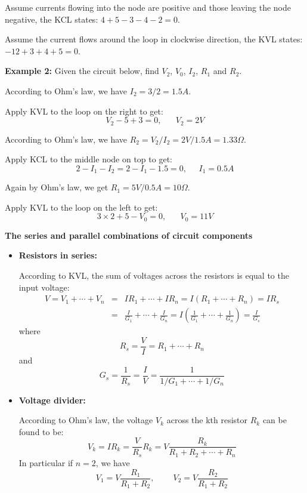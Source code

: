 \begin{itemize}

Assume currents flowing into the node are positive and those leaving the 
node negative, the KCL states: $4+5-3-4-2=0$. 

Assume the current flows around the loop in clockwise direction, the KVL
states: $-12+3+4+5=0$. 

{\bf Example 2:}  Given the circuit below, find $V_2$, $V_0$, $I_2$, $R_1$
and $R_2$.


According to Ohm's law, we have $I_2=3/2=1.5A$.  

Apply KVL to the loop on the right to get:
\[  V_2-5+3=0,\;\;\;\;\;\; V_2=2V \]

According to Ohm's law, we have $R_2=V_2/I_2=2V/1.5A=1.33\Omega$.

Apply KCL to the middle node on top to get:
\[ 2-I_1-I_2=2-I_1-1.5=0,\;\;\;\;\;I_1=0.5A \]

Again by Ohm's law, we get $R_1=5V/0.5A=10\Omega$. 

Apply KVL to the loop on the left to get:
\[ 3\times 2 +5-V_0=0,\;\;\;\;\;\;V_0=11V \]

{\bf The series and parallel combinations of circuit components}

\begin{itemize}

\item {\bf Resistors in series:} 


  According to KVL, the sum of voltages across 
  the resistors is equal to the input voltage:
  \begin{eqnarray}	
    V=V_1+\cdots+V_n&=&IR_1+\cdots+IR_n=I(R_1+\cdots+R_n)=IR_s
    \nonumber \\
    &=&\frac{I}{G_1}+\cdots+\frac{I}{G_n}
    =I\left(\frac{1}{G_1}+\cdots+\frac{1}{G_n}\right)=\frac{I}{G_s}
    \nonumber
  \end{eqnarray}
  where
  \[ 
  R_s=\frac{V}{I}=R_1+\cdots+R_n	
  \]
  and
  \[ 
  G_s=\frac{1}{R_s}=\frac{I}{V}=\frac{1}{1/G_1+\cdots+1/G_n}
  \]

\item {\bf Voltage divider:}

  According to Ohm's law, the voltage $V_k$ across the kth resistor $R_k$ can be 
  found to be:
  \[
  V_k=IR_k=\frac{V}{R_s}R_k=V\frac{R_k}{R_1+R_2+\cdots+R_n} 
  \]
  In particular if $n=2$, we have
  \[ 
  V_1=V\frac{R_1}{R_1+R_2},\;\;\;\;\;\;\;\;V_2=V\frac{R_2}{R_1+R_2} 
  \]


\end{itemize}
\end{itemize}
